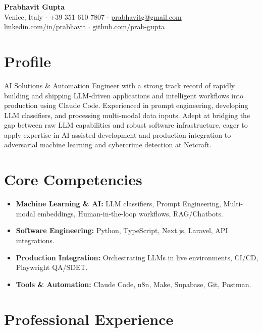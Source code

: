 \documentclass[11pt,a4paper]{article}
\begin{document}
\begin{center}
    {\LARGE \textbf{Prabhavit Gupta}} \\
    \vspace{0.5em}
    Venice, Italy $\cdot$ +39 351 610 7807 $\cdot$ \href{mailto:prabhavitg@gmail.com}{prabhavitg@gmail.com} \\
    \href{https://linkedin.com/in/prabhavit}{linkedin.com/in/prabhavit} $\cdot$ \href{https://github.com/prab-gupta}{github.com/prab-gupta}
\end{center}

\vspace{1em}

\section{Profile}
AI Solutions \& Automation Engineer with a strong track record of rapidly building and shipping LLM-driven applications and intelligent workflows into production using Claude Code. Experienced in prompt engineering, developing LLM classifiers, and processing multi-modal data inputs. Adept at bridging the gap between raw LLM capabilities and robust software infrastructure, eager to apply expertise in AI-assisted development and production integration to adversarial machine learning and cybercrime detection at Netcraft.

\section{Core Competencies}
\begin{itemize}[leftmargin=*, parsep=0pt, itemsep=2pt]
    \item \textbf{Machine Learning \& AI:} LLM classifiers, Prompt Engineering, Multi-modal embeddings, Human-in-the-loop workflows, RAG/Chatbots.
    \item \textbf{Software Engineering:} Python, TypeScript, Next.js, Laravel, API integrations.
    \item \textbf{Production Integration:} Orchestrating LLMs in live environments, CI/CD, Playwright QA/SDET.
    \item \textbf{Tools \& Automation:} Claude Code, n8n, Make, Supabase, Git, Postman.
\end{itemize}

\section{Professional Experience}
\end{document}
